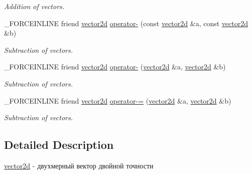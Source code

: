 \begin{DoxyCompactItemize}
\begin{DoxyCompactList}\small\item\em Addition of vectors. \end{DoxyCompactList}\item 
\hypertarget{classbt_1_1vector2d_a75d0883135c82d1b954945d573f0f43d}{\-\_\-\-F\-O\-R\-C\-E\-I\-N\-L\-I\-N\-E friend \hyperlink{classbt_1_1vector2d}{vector2d} \hyperlink{classbt_1_1vector2d_a75d0883135c82d1b954945d573f0f43d}{operator-\/} (const \hyperlink{classbt_1_1vector2d}{vector2d} \&a, const \hyperlink{classbt_1_1vector2d}{vector2d} \&b)}\label{classbt_1_1vector2d_a75d0883135c82d1b954945d573f0f43d}

\begin{DoxyCompactList}\small\item\em Subtraction of vectors. \end{DoxyCompactList}\item 
\hypertarget{classbt_1_1vector2d_a9e8349b2cae44cb0fe8bf3ff821e03ef}{\-\_\-\-F\-O\-R\-C\-E\-I\-N\-L\-I\-N\-E friend \hyperlink{classbt_1_1vector2d}{vector2d} \hyperlink{classbt_1_1vector2d_a9e8349b2cae44cb0fe8bf3ff821e03ef}{operator-\/} (\hyperlink{classbt_1_1vector2d}{vector2d} \&a, \hyperlink{classbt_1_1vector2d}{vector2d} \&b)}\label{classbt_1_1vector2d_a9e8349b2cae44cb0fe8bf3ff821e03ef}

\begin{DoxyCompactList}\small\item\em Subtraction of vectors. \end{DoxyCompactList}\item 
\hypertarget{classbt_1_1vector2d_acadc9646a7e03a9dc23c756e02d494b9}{\-\_\-\-F\-O\-R\-C\-E\-I\-N\-L\-I\-N\-E friend \hyperlink{classbt_1_1vector2d}{vector2d} \hyperlink{classbt_1_1vector2d_acadc9646a7e03a9dc23c756e02d494b9}{operator-\/=} (\hyperlink{classbt_1_1vector2d}{vector2d} \&a, \hyperlink{classbt_1_1vector2d}{vector2d} \&b)}\label{classbt_1_1vector2d_acadc9646a7e03a9dc23c756e02d494b9}

\begin{DoxyCompactList}\small\item\em Subtraction of vectors. \end{DoxyCompactList}\end{DoxyCompactItemize}


\subsection{Detailed Description}
\hyperlink{classbt_1_1vector2d}{vector2d} -\/ двухмерный вектор двойной точности 

